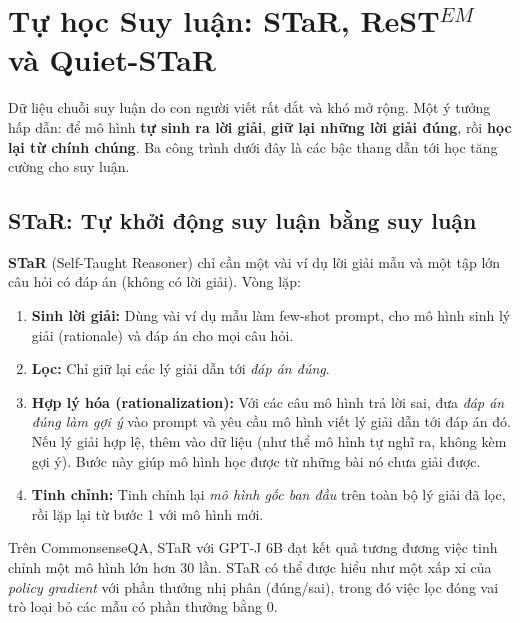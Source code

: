 
\section{Tự học Suy luận: STaR, ReST\texorpdfstring{$^{EM}$}{-EM} và Quiet-STaR \newtag}
\label{sec:self_improvement}

Dữ liệu chuỗi suy luận do con người viết rất đắt và khó mở rộng. Một ý tưởng hấp dẫn: để mô hình \textbf{tự sinh ra lời giải}, \textbf{giữ lại những lời giải đúng}, rồi \textbf{học lại từ chính chúng}. Ba công trình dưới đây là các bậc thang dẫn tới học tăng cường cho suy luận.

\subsection{STaR: Tự khởi động suy luận bằng suy luận}
\label{ssec:star}
\textbf{STaR} (Self-Taught Reasoner) \cite{zelikman2022star} chỉ cần một vài ví dụ lời giải mẫu và một tập lớn câu hỏi có đáp án (không có lời giải). Vòng lặp:
\begin{enumerate}
	\item \textbf{Sinh lời giải:} Dùng vài ví dụ mẫu làm few-shot prompt, cho mô hình sinh lý giải (rationale) và đáp án cho mọi câu hỏi.
	\item \textbf{Lọc:} Chỉ giữ lại các lý giải dẫn tới \emph{đáp án đúng}.
	\item \textbf{Hợp lý hóa (rationalization):} Với các câu mô hình trả lời sai, đưa \emph{đáp án đúng làm gợi ý} vào prompt và yêu cầu mô hình viết lý giải dẫn tới đáp án đó. Nếu lý giải hợp lệ, thêm vào dữ liệu (như thể mô hình tự nghĩ ra, không kèm gợi ý). Bước này giúp mô hình học được từ những bài nó chưa giải được.
	\item \textbf{Tinh chỉnh:} Tinh chỉnh lại \emph{mô hình gốc ban đầu} trên toàn bộ lý giải đã lọc, rồi lặp lại từ bước 1 với mô hình mới.
\end{enumerate}
Trên CommonsenseQA, STaR với GPT-J 6B đạt kết quả tương đương việc tinh chỉnh một mô hình lớn hơn 30 lần. STaR có thể được hiểu như một xấp xỉ của \emph{policy gradient} với phần thưởng nhị phân (đúng/sai), trong đó việc lọc đóng vai trò loại bỏ các mẫu có phần thưởng bằng 0.

